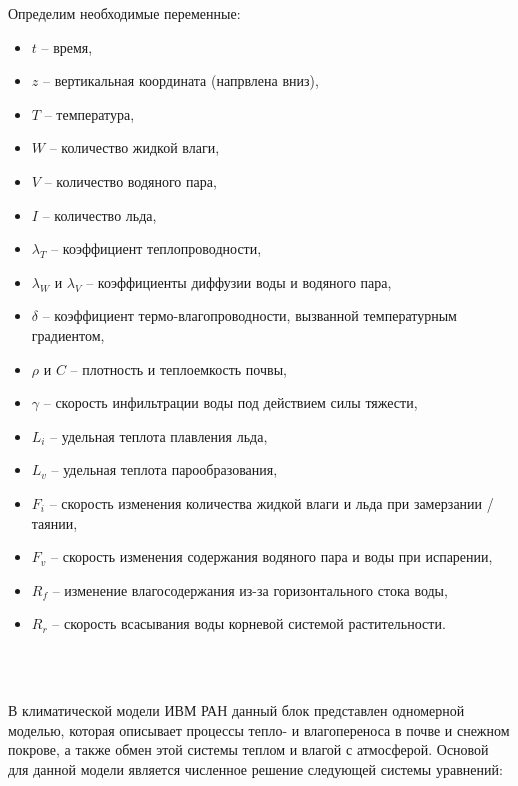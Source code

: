 \documentclass[a4paper, fontsize=14pt]{scrartcl}
\begin{document}
\newpage
Определим необходимые переменные:
\begin{itemize}
    \item $t$ -- время, 
    \item $z$ -- вертикальная координата (напрвлена вниз), 
    \item $T$ -- температура, 
    \item $W$ -- количество жидкой влаги, 
    \item $V$ -- количество водяного пара, 
    \item $I$ -- количество льда, 
    \item $\lambda_T$ -- коэффициент теплопроводности, 
    \item $\lambda_W$ и $\lambda_V$ -- коэффициенты диффузии воды и водяного пара, 
    \item $\delta$ -- коэффициент термо-влагопроводности, вызванной температурным градиентом, 
    \item $\rho$ и $C$ -- плотность и теплоемкость почвы, 
    \item $\gamma$ -- скорость инфильтрации воды под действием силы тяжести, 
    \item $L_i$ -- удельная теплота плавления льда, 
    \item $L_v$ -- удельная теплота парообразования, 
    \item $F_i$ -- скорость изменения количества жидкой влаги и льда при замерзании / таянии, 
    \item $F_v$ -- скорость изменения содержания водяного пара и воды при испарении, 
    \item $R_f$ -- изменение влагосодержания из-за горизонтального стока воды, 
    \item $R_r$ -- скорость всасывания воды корневой системой растительности.
\end{itemize} 

\\~

В климатической модели ИВМ РАН данный блок представлен одномерной моделью, которая описывает процессы тепло- и влагопереноса в почве и снежном покрове, а также обмен этой системы теплом и влагой с атмосферой. Основой для данной модели является численное решение следующей системы уравнений:
\end{document}

